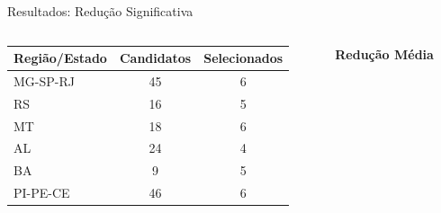 \documentclass[aspectratio=169,11pt]{beamer}
\begin{document}
\begin{frame}{Resultados: Redução Significativa}
\begin{columns}
    \begin{column}{0.5\textwidth}
        \begin{center}
        \begin{tabular}{lcc}
        \textbf{Região/Estado} & \textbf{Candidatos} & \textbf{Selecionados} \\
        \midrule
        MG-SP-RJ    & 45 & 6 \\
        RS          & 16 & 5 \\
        MT          & 18 & 6 \\
        AL          & 24 & 4 \\
        BA          & 9  & 5 \\
        PI-PE-CE    & 46 & 6 \\
        \end{tabular}
        \end{center}
    \end{column}
    \begin{column}{0.45\textwidth}
        \begin{center}
            \textbf{Redução Média}
        \end{center}
    \end{column}
\end{columns}
\end{frame}
\end{document}
